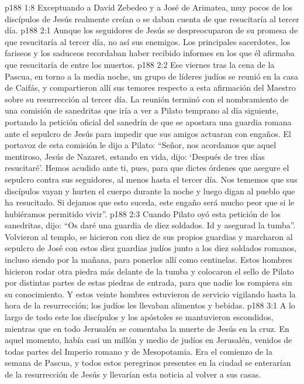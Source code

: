 \vs p188 1:8 Exceptuando a David Zebedeo y a José de Arimatea, muy pocos de los discípulos de Jesús realmente creían o se daban cuenta de que resucitaría al tercer día.
\vs p188 2:1 Aunque los seguidores de Jesús se despreocuparon de su promesa de que resucitaría al tercer día, no así sus enemigos. Los principales sacerdotes, los fariseos y los saduceos recordaban haber recibido informes en los que él afirmaba que resucitaría de entre los muertos.
\vs p188 2:2 Ese viernes tras la cena de la Pascua, en torno a la media noche, un grupo de líderes judíos se reunió en la casa de Caifás, y compartieron allí sus temores respecto a esta afirmación del Maestro sobre su resurrección al tercer día. La reunión terminó con el nombramiento de una comisión de sanedritas que iría a ver a Pilato temprano al día siguiente, portando la petición oficial del sanedrín de que se apostara una guardia romana ante el sepulcro de Jesús para impedir que sus amigos actuaran con engaños. El portavoz de esta comisión le dijo a Pilato: “Señor, nos acordamos que aquel mentiroso, Jesús de Nazaret, estando en vida, dijo: ‘Después de tres días resucitaré’. Hemos acudido ante ti, pues, para que dictes órdenes que asegure el sepulcro contra sus seguidores, al menos hasta el tercer día. Nos tememos que sus discípulos vayan y hurten el cuerpo durante la noche y luego digan al pueblo que ha resucitado. Si dejamos que esto suceda, este engaño será mucho peor que si le hubiéramos permitido vivir”.
\vs p188 2:3 Cuando Pilato oyó esta petición de los sanedritas, dijo: “Os daré una guardia de diez soldados. Id y asegurad la tumba”. Volvieron al templo, se hicieron con diez de sus propios guardias y marcharon al sepulcro de José con estos diez guardias judíos junto a los diez soldados romanos, incluso siendo  por la mañana, para ponerlos allí como centinelas. Estos hombres hicieron rodar otra piedra más delante de la tumba y colocaron el sello de Pilato por distintas partes de estas piedras de entrada, para que nadie los rompiera sin su conocimiento. Y estos veinte hombres estuvieron de servicio vigilando hasta la hora de la resurrección; los judíos les llevaban alimentos y bebidas.
\vs p188 3:1 A lo largo de todo este  los discípulos y los apóstoles se mantuvieron escondidos, mientras que en todo Jerusalén se comentaba la muerte de Jesús en la cruz. En aquel momento, había casi un millón y medio de judíos en Jerusalén, venidos de todas partes del Imperio romano y de Mesopotamia. Era el comienzo de la semana de Pascua, y todos estos peregrinos presentes en la ciudad se enterarían de la resurrección de Jesús y llevarían esta noticia al volver a sus casas.

